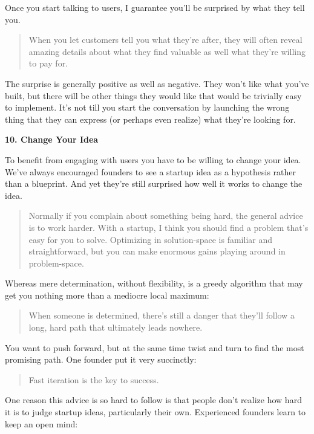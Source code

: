 Once you start talking to users, I guarantee you'll be surprised by what
they tell you.

\begin{quote}
When you let customers tell you what they're after, they will often
reveal amazing details about what they find valuable as well what
they're willing to pay for.
\end{quote}

The surprise is generally positive as well as negative. They won't like
what you've built, but there will be other things they would like that
would be trivially easy to implement. It's not till you start the
conversation by launching the wrong thing that they can express (or
perhaps even realize) what they're looking for.

\textbf{10. Change Your Idea}

To benefit from engaging with users you have to be willing to change
your idea. We've always encouraged founders to see a startup idea as a
hypothesis rather than a blueprint. And yet they're still surprised how
well it works to change the idea.

\begin{quote}
Normally if you complain about something being hard, the general advice
is to work harder. With a startup, I think you should find a problem
that's easy for you to solve. Optimizing in solution-space is familiar
and straightforward, but you can make enormous gains playing around in
problem-space.
\end{quote}

Whereas mere determination, without flexibility, is a greedy algorithm
that may get you nothing more than a mediocre local maximum:

\begin{quote}
When someone is determined, there's still a danger that they'll follow a
long, hard path that ultimately leads nowhere.
\end{quote}

You want to push forward, but at the same time twist and turn to find
the most promising path. One founder put it very succinctly:

\begin{quote}
Fast iteration is the key to success.
\end{quote}

One reason this advice is so hard to follow is that people don't realize
how hard it is to judge startup ideas, particularly their own.
Experienced founders learn to keep an open mind:

